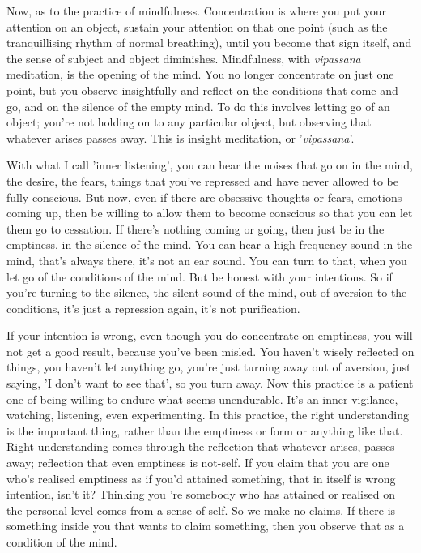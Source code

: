 
Now, as to the practice of mindfulness. Concentration is where you put your attention on an object, sustain your attention on that one point (such as the tranquillising rhythm of normal breathing), until you become that sign itself, and the sense of subject and object diminishes. Mindfulness, with \textit{vipassana} meditation, is the opening of the mind. You no longer concentrate on just one point, but you observe insightfully and reflect on the conditions that come and go, and on the silence of the empty mind. To do this involves letting go of an object; you're not holding on to any particular object, but observing that whatever arises passes away. This is insight meditation, or '\textit{vipassana}'.

With what I call 'inner listening', you can hear the noises that go on in the mind, the desire, the fears, things that you've repressed and have never allowed to be fully conscious. But now, even if there are obsessive thoughts or fears, emotions coming up, then be willing to allow them to become conscious so that you can let them go to cessation. If there's nothing coming or going, then just be in the emptiness, in the silence of the mind. You can hear a high frequency sound in the mind, that's always there, it's not an ear sound. You can turn to that, when you let go of the conditions of the mind. But be honest with your intentions. So if you're turning to the silence, the silent sound of the mind, out of aversion to the conditions, it's just a repression again, it's not purification.

If your intention is wrong, even though you do concentrate on emptiness, you will not get a good result, because you've been misled. You haven't wisely reflected on things, you haven't let anything go, you're just turning away out of aversion, just saying, 'I don't want to see that', so you turn away. Now this practice is a patient one of being willing to endure what seems unendurable. It's an inner vigilance, watching, listening, even experimenting. In this practice, the right understanding is the important thing, rather than the emptiness or form or anything like that. Right understanding comes through the reflection that whatever arises, passes away; reflection that even emptiness is not-self. If you claim that you are one who's realised emptiness as if you'd attained something, that in itself is wrong intention, isn't it? Thinking you 're somebody who has attained or realised on the personal level comes from a sense of self. So we make no claims. If there is something inside you that wants to claim something, then you observe that as a condition of the mind.

